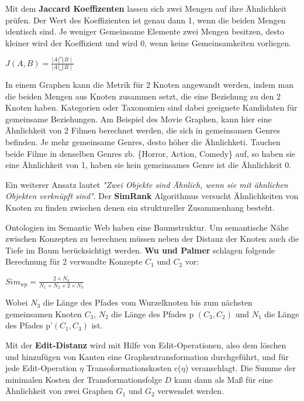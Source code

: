 Mit dem \textbf{Jaccard Koeffizenten} lassen sich zwei Mengen auf ihre Ähnlichkeit prüfen. Der Wert des Koeffizienten ist  genau dann 1, wenn die beiden Mengen identisch sind. Je weniger Gemeinsame Elemente zwei Mengen besitzen, desto kleiner wird der  Koeffizient und wird 0, wenn keine Gemeinsamkeiten vorliegen.
\begin{center}
	$ J(A,B)=\frac{\mid A\bigcap B\mid }{ \mid A \bigcup B \mid }$

\end{center}
In einem Graphen kann die Metrik für 2 Knoten angewandt werden, indem man die beiden Mengen aus Knoten zusammen setzt, die eine Beziehung zu den 2 Knoten haben. Kategorien oder Taxonomien sind dabei geeignete Kandidaten für gemeinsame Beziehungen. Am Beispiel des Movie Graphen, kann hier eine Ähnlichkeit von 2 Filmen berechnet werden, die sich in gemeinsamen Genres befinden. Je mehr gemeinsame Genres, desto höher die Ähnlichketi. Tauchen beide Filme in denselben Genres zb. \{Horror, Action, Comedy\} auf, so haben sie eine Ähnlichkeit von 1, haben sie kein gemeinsames Genre ist die Ähnlichkeit 0.
\vspace{1em}

Ein weiterer Ansatz lautet \textit{"Zwei Objekte sind Ähnlich, wenn sie mit ähnlichen Objekten verknüpft sind"}. Der \textbf{SimRank} \cite{Jeh:2002:SMS:775047.775126} Algorithmus versucht Ähnlichkeiten von Knoten zu finden zwischen denen ein struktureller Zusammenhang besteht. 
\vspace{1em}

Ontologien im Semantic Web haben eine Baumstruktur. Um semantische Nähe zwischen Konzepten zu berechnen müssen neben der Distanz der Knoten auch die Tiefe im Baum berücksichtigt werden. \textbf{Wu und Palmer} \cite{Wu:1994:VSL:981732.981751} schlagen folgende Berechnung für 2 verwandte Konzepte $C_{1}$ und $C_{2}$ vor:\par

\begin{center}
	$Sim_{wp}=\frac{2 \times N_{3}}{N_{1} + N_{2} + 2 \times N_{3}}$
\end{center}

Wobei $N_{3}$ die Länge des Pfades vom Wurzelknoten bis zum nächsten gemeinsamen Knoten $C_{3}$, $N_{2}$ die Länge des Pfades p $(C_{3},C_{2})$ und $N_{1}$ die Länge des Pfades p'$(C_{1},C_{3})$ ist.
\vspace{1em}

Mit der \textbf{Edit-Distanz} \cite{Krumke2012} wird mit Hilfe von Edit-Operationen, also dem löschen und hinzufügen von Kanten eine Graphentransformation durchgeführt, und für jede Edit-Operation $\eta$ Transoformationskosten c($\eta$) veranschlagt. Die Summe der minimalen Kosten der Transformationsfolge $D$ kann dann als Maß für eine Ähnlichkeit von zwei Graphen $G_{1}$ und $G_{2}$ verwendet werden.